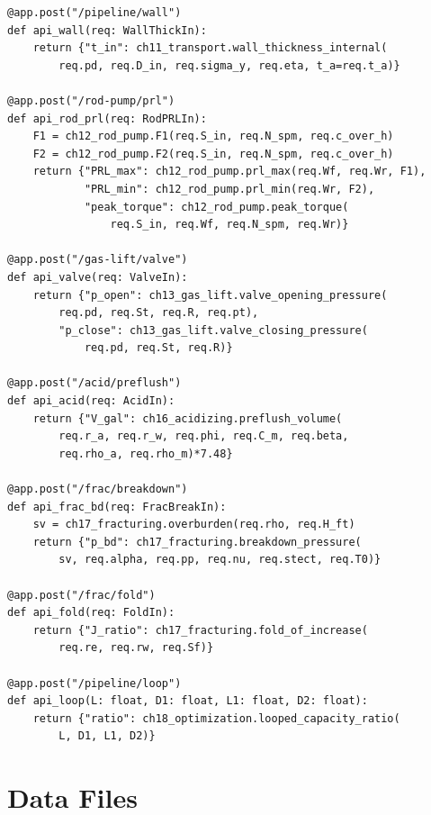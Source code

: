 \documentclass[10pt,a4paper,openany]{book}
\begin{document}
\begin{lstlisting}
@app.post("/pipeline/wall")
def api_wall(req: WallThickIn):
    return {"t_in": ch11_transport.wall_thickness_internal(
        req.pd, req.D_in, req.sigma_y, req.eta, t_a=req.t_a)}

@app.post("/rod-pump/prl")
def api_rod_prl(req: RodPRLIn):
    F1 = ch12_rod_pump.F1(req.S_in, req.N_spm, req.c_over_h)
    F2 = ch12_rod_pump.F2(req.S_in, req.N_spm, req.c_over_h)
    return {"PRL_max": ch12_rod_pump.prl_max(req.Wf, req.Wr, F1),
            "PRL_min": ch12_rod_pump.prl_min(req.Wr, F2),
            "peak_torque": ch12_rod_pump.peak_torque(
                req.S_in, req.Wf, req.N_spm, req.Wr)}

@app.post("/gas-lift/valve")
def api_valve(req: ValveIn):
    return {"p_open": ch13_gas_lift.valve_opening_pressure(
        req.pd, req.St, req.R, req.pt),
        "p_close": ch13_gas_lift.valve_closing_pressure(
            req.pd, req.St, req.R)}

@app.post("/acid/preflush")
def api_acid(req: AcidIn):
    return {"V_gal": ch16_acidizing.preflush_volume(
        req.r_a, req.r_w, req.phi, req.C_m, req.beta,
        req.rho_a, req.rho_m)*7.48}

@app.post("/frac/breakdown")
def api_frac_bd(req: FracBreakIn):
    sv = ch17_fracturing.overburden(req.rho, req.H_ft)
    return {"p_bd": ch17_fracturing.breakdown_pressure(
        sv, req.alpha, req.pp, req.nu, req.stect, req.T0)}

@app.post("/frac/fold")
def api_fold(req: FoldIn):
    return {"J_ratio": ch17_fracturing.fold_of_increase(
        req.re, req.rw, req.Sf)}

@app.post("/pipeline/loop")
def api_loop(L: float, D1: float, L1: float, D2: float):
    return {"ratio": ch18_optimization.looped_capacity_ratio(
        L, D1, L1, D2)}
\end{lstlisting}

\part{Data Files}
\end{document}
